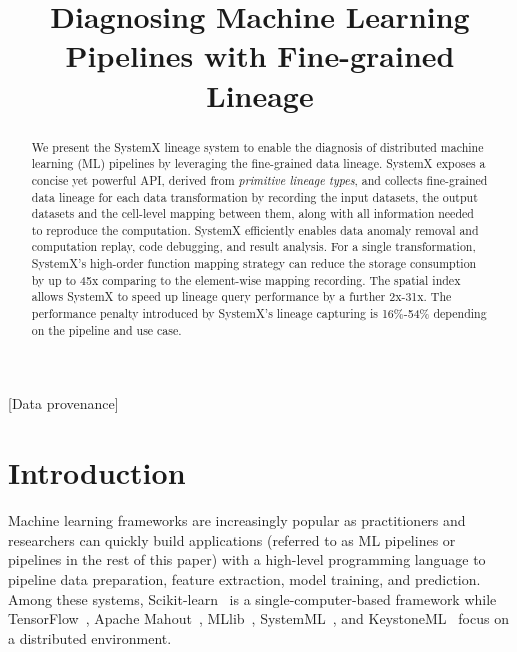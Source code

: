 \documentclass{sig-alternate}
\begin{document}
\title{Diagnosing Machine Learning Pipelines with Fine-grained Lineage}


\maketitle

\begin{abstract}
We present the SystemX lineage system to enable the diagnosis of distributed machine learning (ML) pipelines by leveraging the fine-grained
data lineage.  
SystemX exposes a concise yet powerful API, derived from \emph{primitive lineage types}, and collects fine-grained data lineage for each 
data transformation by recording the input datasets, the output datasets and the cell-level mapping between them, along
with all information needed to reproduce the computation.
SystemX efficiently enables data anomaly removal and computation replay, code debugging, and result analysis.
For a single transformation, SystemX's high-order function mapping strategy can reduce the storage consumption by up to 
45x comparing to the element-wise mapping recording.
The spatial index allows SystemX to speed up lineage query performance by a further 2x-31x. 
The performance penalty introduced by SystemX's lineage capturing is 16\%-54\% depending on the pipeline and use case.
\end{abstract}

[Data provenance]

\section{Introduction}
Machine learning frameworks are increasingly popular as practitioners and researchers can quickly
build applications (referred to as ML pipelines or pipelines in the rest of this paper) with a high-level 
programming language to pipeline data preparation, feature extraction, model training, and prediction. 
Among these systems, Scikit-learn~\cite{pedregosa2011scikit}
is a single-computer-based framework while TensorFlow~\cite{tensorflow15}, Apache Mahout~\cite{owen2011mahout}, MLlib~\cite{meng2015mllib}, 
SystemML~\cite{ghoting11systemml}, and KeystoneML~\cite{sparks15} focus on a distributed environment.
\end{document}
